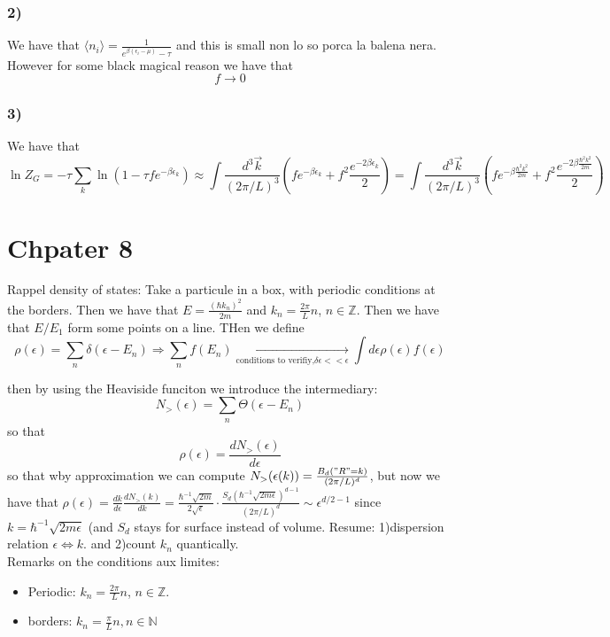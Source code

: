 \documentclass[10pt,a4paper]{book}
\newcommand{\Z}{\mathbb{Z}}
\begin{document}
\subsection*{2)}
We have that $\langle n_i\rangle =\frac{1}{e^{\beta(\epsilon_i-\mu)}-\tau}$ and this is small non lo so porca la balena nera. However for some black magical reason we have that 
$$f\to 0$$

\subsection*{3)}
We have that
$$\ln Z_G=-\tau\sum_k\ln(1-\tau f e^{-\beta\epsilon_k})\approx\int\frac{d^3\vec{k}}{(2\pi/L)^3}(fe^{-\beta\epsilon_k}+f^2\frac{e^{-2\beta\epsilon_k}}{2})=\int\frac{d^3\vec{k}}{(2\pi/L)^3}(fe^{-\beta\frac{\hbar^2 k^2}{2m}}+f^2\frac{e^{-2\beta\frac{\hbar^2 k^2}{2m}}}{2})$$

\chapter*{Chpater 8}
Rappel density of states:
Take a particule in a box, with periodic conditions at the borders. Then we have that $E=\frac{(\hbar k_n)^2}{2m}$ and $k_n=\frac{2\pi}{L}n$, $n\in\mathbb{Z}$. Then we have that  $E/E_1$ form some points on a line. THen we define
$$\rho(\epsilon)=\sum_n\delta(\epsilon-E_n)\Rightarrow \sum_nf(E_n)\underset{\text{conditions to verifiy,} \delta \epsilon<<\epsilon}{\to}\int d\epsilon\rho(\epsilon)f(\epsilon)$$

then by using the Heaviside funciton we introduce the intermediary:
$$N_{>}(\epsilon)=\sum_n\Theta(\epsilon-E_n)$$ so that
$$\rho(\epsilon)=\frac{dN_{>}(\epsilon)}{d\epsilon}$$
so that wby approximation we can compute $N_{>}(\epsilon(k))=\frac{B_d("R"=k)}{(2\pi/L)^d}$, but now we have that $\rho(\epsilon)=\frac{dk}{d\epsilon}\frac{dN_{>}(k)}{dk}=\frac{\hbar^{-1}\sqrt{2m}}{2\sqrt{\epsilon}}\cdot \frac{S_d(\hbar^{-1}\sqrt{2m\epsilon})^{d-1}}{(2\pi/L)^d}\sim \epsilon^{d/2-1}$ since $k=\hbar^{-1}\sqrt{2m\epsilon}$ (and $S_d$ stays for surface instead of volume. Resume: 1)dispersion relation $\epsilon\Leftrightarrow k$. and 2)count $k_n$ quantically. \\
Remarks on the conditions aux limites:
\begin{itemize}
\item Periodic: $k_n=\frac{2\pi}{L}n$, $n\in\Z$.
\item borders: $k_n=\frac{\pi}{L}n,n\in\mathbb{N}$
\end{itemize}
\end{document}
